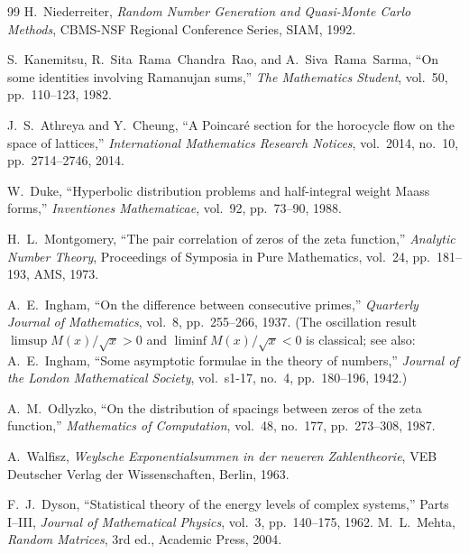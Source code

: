 \documentclass[11pt]{article}
\theoremstyle{definition}
\begin{document}
\begin{thebibliography}{99}
H.~Niederreiter,
\emph{Random Number Generation and Quasi-Monte Carlo Methods},
CBMS-NSF Regional Conference Series, SIAM, 1992.

S.~Kanemitsu, R.~Sita~Rama~Chandra~Rao, and A.~Siva~Rama~Sarma,
``On some identities involving Ramanujan sums,''
\emph{The Mathematics Student}, vol.~50, pp.~110--123, 1982.

J.~S.~Athreya and Y.~Cheung,
``A Poincar\'e section for the horocycle flow on the space of
lattices,''
\emph{International Mathematics Research Notices},
vol.~2014, no.~10, pp.~2714--2746, 2014.

W.~Duke,
``Hyperbolic distribution problems and half-integral weight Maass forms,''
\emph{Inventiones Mathematicae}, vol.~92, pp.~73--90, 1988.

H.~L.~Montgomery,
``The pair correlation of zeros of the zeta function,''
\emph{Analytic Number Theory}, Proceedings of Symposia in Pure
Mathematics, vol.~24, pp.~181--193, AMS, 1973.

A.~E.~Ingham,
``On the difference between consecutive primes,''
\emph{Quarterly Journal of Mathematics}, vol.~8, pp.~255--266, 1937.
(The oscillation result $\limsup M(x)/\sqrt{x} > 0$ and
$\liminf M(x)/\sqrt{x} < 0$ is classical; see also:
A.~E.~Ingham, ``Some asymptotic formulae in the theory of numbers,''
\emph{Journal of the London Mathematical Society}, vol.~s1-17,
no.~4, pp.~180--196, 1942.)

A.~M.~Odlyzko,
``On the distribution of spacings between zeros of the zeta function,''
\emph{Mathematics of Computation}, vol.~48, no.~177, pp.~273--308, 1987.

A.~Walfisz,
\emph{Weylsche Exponentialsummen in der neueren Zahlentheorie},
VEB Deutscher Verlag der Wissenschaften, Berlin, 1963.

F.~J.~Dyson,
``Statistical theory of the energy levels of complex systems,'' Parts I--III,
\emph{Journal of Mathematical Physics}, vol.~3, pp.~140--175, 1962.
M.~L.~Mehta,
\emph{Random Matrices}, 3rd ed., Academic Press, 2004.

\end{thebibliography}
\end{document}
